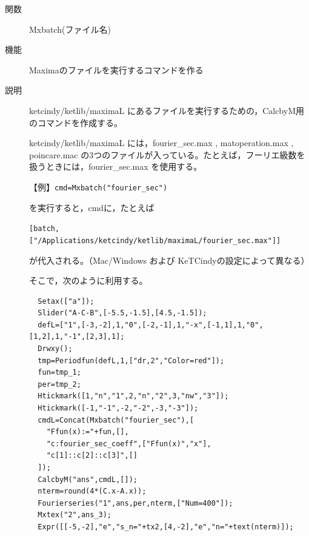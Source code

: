 \documentclass[papersize,a4paper,12pt,uplatex]{jsarticle}
\begin{document}
\begin{description}

\vspace{\baselineskip}
\hypertarget{mxbatch}{}
\item[関数]  Mxbatch(ファイル名)
\item[機能]  Maximaのファイルを実行するコマンドを作る
\item[説明]  ketcindy/ketlib/maximaL にあるファイルを実行するための，CalcbyM用のコマンドを作成する。

ketcindy/ketlib/maximaL には，fourier\_sec.max , matoperation.max , poincare.mac の3つのファイルが入っている。たとえば，フーリエ級数を扱うときには，fourier\_sec.max を使用する。

\vspace{\baselineskip}
【例】\verb|cmd=Mxbatch("fourier_sec")|

  を実行すると，cmdに，たとえば
  
    \verb|[batch,["/Applications/ketcindy/ketlib/maximaL/fourier_sec.max"]] |
    
  が代入される。（Mac/Windows および KeTCindyの設定によって異なる）
  
  そこで，次のように利用する。

\begin{verbatim}
  Setax(["a"]); 
  Slider("A-C-B",[-5.5,-1.5],[4.5,-1.5]);
  defL=["1",[-3,-2],1,"0",[-2,-1],1,"-x",[-1,1],1,"0",[1,2],1,"-1",[2,3],1];
  Drwxy();
  tmp=Periodfun(defL,1,["dr,2","Color=red"]);
  fun=tmp_1;
  per=tmp_2;
  Htickmark([1,"n","1",2,"n","2",3,"nw","3"]);
  Htickmark([-1,"-1",-2,"-2",-3,"-3"]);
  cmdL=Concat(Mxbatch("fourier_sec"),[
    "Ffun(x):="+fun,[],
    "c:fourier_sec_coeff",["Ffun(x)","x"],
    "c[1]::c[2]::c[3]",[]
  ]);
  CalcbyM("ans",cmdL,[]);
  nterm=round(4*(C.x-A.x));
  Fourierseries("1",ans,per,nterm,["Num=400"]);
  Mxtex("2",ans_3);
  Expr([[-5,-2],"e","s_n="+tx2,[4,-2],"e","n="+text(nterm)]);
\end{verbatim}

\hspace{20mm}


\end{description}
\end{document}
